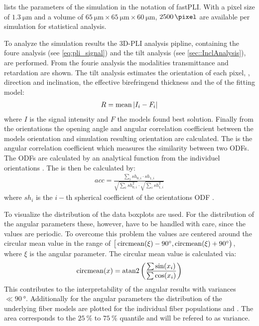 % 
 lists the parameters of the simulation in the notation of \ac{fastPLI}.
With a pixel size of $\SI{1.3}{\micro\meter}$ and a volume of $\SI{65}{\micro\meter} \times \SI{65}{\micro\meter} \times \SI{60}{\micro\meter}$, $\SI{2500}{\pixel}$ are available per simulation for statistical analysis.
\par
% 
To analyze the simulation results the \ac{3D-PLI} analysis pipline, containing the foure analysis (see \cref{eq:pli_signal}) and the tilt analysis (see \cref{sec::InclAnalysis}), are performed.
From the fourie analysis the modalities transmittance and retardation are shown.
The tilt analysis estimates the orientation of each pixel, \ie{}, direction and inclination, the effective birefringend thickness \trel{} and the \rvalue{} of the fitting model:
\begin{align}
    R = \operatorname{mean}{|I_i-F_i|} \label{eq:rvalue}
\end{align}
where $I$ is the signal intensity and $F$ the models found best solution.
Finally from the orientations the opening angle \openingAngle{} and angular correlation coefficient \accvalue{} between the models orientation and simulation resulting orientation are calculated.
The \accvalue{} is the angular correlation coefficient which measures the similarity between two \acp{ODF}. The \acp{ODF} are calculated by an analytical function from the individuel orientations \cite{Alimi2020}.
The \accvalue{} is then be calculated by:
\begin{align}
    acc = \frac{\sum_i{\mathit{sh}_{0,i} \cdot \mathit{sh}_{1,i}}}{\sqrt{\sum_i{\mathit{sh}_{0,i}^2}} \cdot \sqrt{\sum_i{\mathit{sh}_{1,i}^2}}}
\end{align}
where $\mathit{sh}_i$ is the $i-$th spherical coefficient of the orientations \ac{ODF} \cite{Schilling2018}.
\par
%
To visualize the distribution of the data boxplots are used.
For the distribution of the angular parameters these, however, have to be handled with care, since the values are periodic.
To overcome this problem the values are centered around the circular mean value in the range of $\big[\operatorname{circmean} (\xi)-\SI{90}{\degree}, \operatorname{circmean}(\xi)+\SI{90}{\degree}\big)$, where $\xi$ is the angular parameter.
The circular mean value is calculated via:
\begin{align}
    \operatorname{circmean}(x) = \operatorname{atan2} \left ( \frac{\sum \sin(x_i) }{\sum \cos(x_i) } \right )
\end{align}
This contributes to the interpretability of the angular results with variances $\ll \SI{90}{\degree}$.
Additionally for the angular parameters the distribution of the underlying fiber models are plotted for the individual fiber populations \popa{} and \popb{}.
The area corresponds to the $\SI{25}{\percent}$ to $\SI{75}{\percent}$ quantile and will be refered to as \bvariance{} variance.
% 
% 
% 
